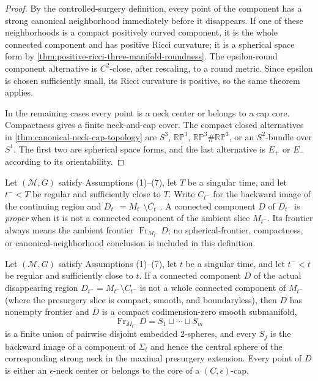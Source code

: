 \begin{proof}
By the controlled-surgery definition, every point of the component has a
strong canonical neighborhood immediately before it disappears.  If one of
these neighborhoods is a compact positively curved component, it is the
whole connected component and has positive Ricci curvature; it is a
spherical space form by
\ref{thm:positive-ricci-three-manifold-roundness}.  The epsilon-round
component alternative is $C^2$-close, after rescaling, to a round metric.
Since epsilon is chosen sufficiently small, its Ricci curvature is positive,
so the same theorem applies.

In the remaining cases every point is a neck center or belongs to a cap core.
Compactness gives a finite neck-and-cap cover.  The compact closed
alternatives in \ref{thm:canonical-neck-cap-topology} are $S^3$,
$\mathbb{RP}^3$, $\mathbb{RP}^3\#\mathbb{RP}^3$, or an $S^2$-bundle over
$S^1$.  The first two are spherical space forms, and the last alternative is
$E_+$ or $E_-$ according to its orientability.
\end{proof}

\begin{definition}
\label{def:proper-disappearing-component}
\notready
Let $({\mathcal M},G)$ satisfy Assumptions (1)--(7), let $T$ be a singular
time, and let $t^-<T$ be regular and sufficiently close to $T$.  Write
$C_{t^-}$ for the backward image of the continuing region and
$D_{t^-}=M_{t^-}\setminus C_{t^-}$.  A connected component $D$ of
$D_{t^-}$ is \emph{proper} when it is not a connected component of the ambient
slice $M_{t^-}$.  Its frontier always means the ambient frontier
$\operatorname{Fr}_{M_{t^-}}D$; no spherical-frontier, compactness, or
canonical-neighborhood conclusion is included in this definition.
\end{definition}

\begin{lemma}
\label{lem:actual-disappearing-component-frontier-saturation}
\notready
Let $({\mathcal M},G)$ satisfy Assumptions (1)--(7), let $t$ be a singular
time, and let $t^-<t$ be regular and sufficiently close to $t$.  If a connected
component $D$ of the actual disappearing region
$D_{t^-}=M_{t^-}\setminus C_{t^-}$ is not a whole connected component of
$M_{t^-}$ (where the presurgery slice is compact, smooth, and boundaryless),
then $D$ has nonempty frontier and $\overline D$ is a
compact codimension-zero smooth submanifold,
\[
 \operatorname{Fr}_{M_{t^-}}D=S_1\sqcup\cdots\sqcup S_m
\]
is a finite union of pairwise disjoint embedded $2$-spheres, and every
$S_j$ is the backward image of a component of $\Sigma_t$ and hence the central
sphere of the corresponding strong neck in the maximal presurgery extension.
Every point of $D$ is either an $\epsilon$-neck center or belongs to the core
of a $(C,\epsilon)$-cap.
\end{lemma}

